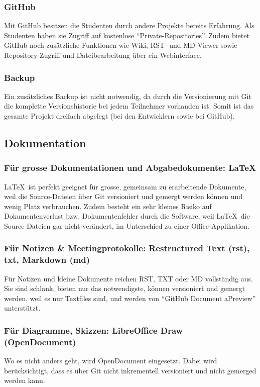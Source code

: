 \subsubsection{GitHub}
Mit GitHub besitzen die Studenten durch andere Projekte bereits Erfahrung. Als
Studenten haben sie Zugriff auf kostenlose "`Private-Repositories"'. Zudem
bietet GitHub noch zusätzliche Funktionen wie Wiki, RST- und MD-Viewer sowie
Repository-Zugriff und Dateibearbeitung über ein Webinterface.

\subsubsection{Backup}
Ein zusätzliches Backup ist nicht notwendig, da durch die Versionierung mit Git die komplette Versionshistorie bei jedem Teilnehmer vorhanden ist. Somit ist das gesamte Projekt dreifach abgelegt (bei den Entwicklern sowie bei GitHub).


\subsection{Dokumentation}
\subsubsection{Für grosse Dokumentationen und Abgabedokumente: \LaTeX}
\LaTeX\ ist perfekt geeignet für grosse, gemeinsam zu erarbeitende Dokumente,
weil die Source-Dateien über Git versioniert und gemergt werden können und wenig
Platz verbrauchen. Zudem besteht ein sehr kleines Risiko auf Dokumentenverlust
bzw. Dokumentenfehler durch die Software, weil \LaTeX\ die Source-Dateien gar
nicht verändert, im Unterschied zu einer Office-Applikation.

\subsubsection{Für Notizen \& Meetingprotokolle: Restructured Text (rst), txt, Markdown (md)}
Für Notizen und kleine Dokumente reichen RST, TXT oder MD vollständig aus. Sie
sind schlank, bieten nur das notwendigste, können versioniert und gemergt
werden, weil es nur Textfiles sind, und werden von "`GitHub Document aPreview"'
unterstützt.

\subsubsection{Für Diagramme, Skizzen: LibreOffice Draw (OpenDocument)}
Wo es nicht anders geht, wird OpenDocument eingesetzt. Dabei wird
berücksichtigt, dass es über Git nicht inkrementell versioniert und nicht
gemerged werden kann.


